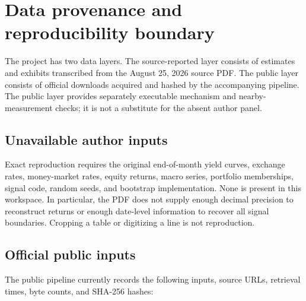\section{Data provenance and reproducibility boundary}\label{app:provenance}

The project has two data layers. The source-reported layer consists of estimates and exhibits transcribed from the August 25, 2026 source PDF. The public layer consists of official downloads acquired and hashed by the accompanying pipeline. The public layer provides separately executable mechanism and nearby-measurement checks; it is not a substitute for the absent author panel.

\subsection{Unavailable author inputs}

Exact reproduction requires the original end-of-month yield curves, exchange rates, money-market rates, equity returns, macro series, portfolio memberships, signal code, random seeds, and bootstrap implementation. None is present in this workspace. In particular, the PDF does not supply enough decimal precision to reconstruct returns or enough date-level information to recover all signal boundaries. Cropping a table or digitizing a line is not reproduction.

\subsection{Official public inputs}

The public pipeline currently records the following inputs, source URLs, retrieval times, byte counts, and SHA-256 hashes:

